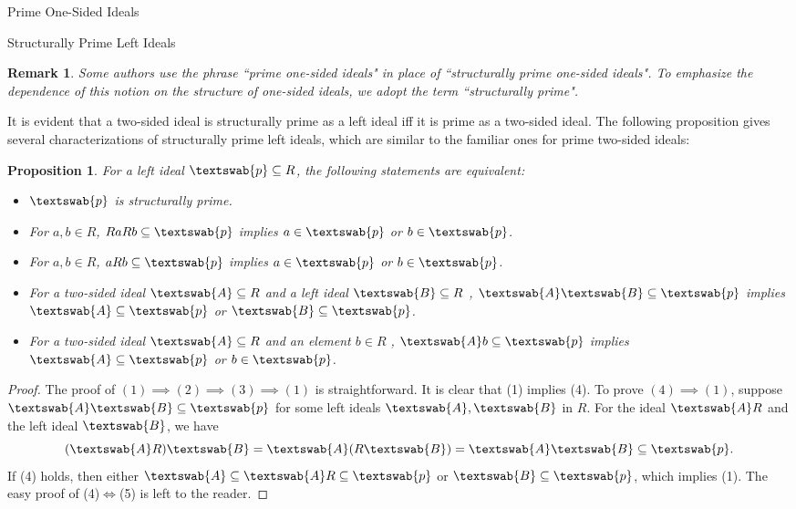 \documentclass[11pt,a4paper]{article}
\theoremstyle{theorem}
\newtheorem{proposition}[theorem]{Proposition}
\newtheorem{remark}{Remark}[section]
\numberwithin{equation}{section}
\begin{document}
\begin{section}{Prime One-Sided Ideals}
\begin{subsection}{Structurally Prime Left Ideals}
 \begin{remark}
 	Some authors use the phrase ``prime one-sided ideals" in place of ``structurally prime one-sided ideals".  To emphasize the dependence of this notion on the structure of one-sided ideals, we adopt the term ``structurally prime". 
 \end{remark}
 It is evident that a two-sided ideal is structurally prime as a left ideal iff it is prime as a two-sided ideal. The following proposition gives several characterizations of structurally prime left ideals, which are similar to the familiar ones for prime two-sided ideals:
 \begin{proposition}\label{prop: characterization of structurally prime ideals}
 	For a left ideal \( \textswab{p} \subseteq R \), the following statements are equivalent:
 	\begin{itemize}
 		\item[(1)] \( \textswab{p} \) is structurally prime.
 		\item[(2)] For \( a,b\in R\), \(RaRb\subseteq \textswab{p}\) implies \( a\in \textswab{p} \) or \( b\in   \textswab{p} \).
 		\item[(3)] For \( a,b\in R\), \(aRb\subseteq \textswab{p}\) implies \( a\in \textswab{p} \) or \( b\in   \textswab{p} \).
 		\item[(4)]  For a two-sided ideal \( \textswab{A} \subseteq R \) and a left ideal  \( \textswab{B} \subseteq R \)  , \( \textswab{A}\textswab{B} \subseteq \textswab{p} \) implies \( \textswab{A} \subseteq \textswab{p} \) or \( \textswab{B} \subseteq \textswab{p} \).
 		\item[(5)]  For a two-sided ideal \( \textswab{A} \subseteq R \) and an element  \( b\in R \)  , \( \textswab{A}b \subseteq \textswab{p} \) implies \( \textswab{A} \subseteq \textswab{p} \) or \( b \in \textswab{p} \).
 	\end{itemize}
 \end{proposition}
 \begin{proof}
 	The proof of \((1)\implies (2)\implies (3)\implies (1)\) is straightforward. It is clear that (1) implies (4). To prove \((4)\implies (1)\), suppose  \( \textswab{A}\textswab{B}\subseteq\textswab{p}\) for some left ideals \( \textswab{A},\textswab{B}\) in \(R\). For the ideal \(\textswab{A}R \) and the left ideal \(\textswab{B}\), we have
 	\[
 		(\textswab{A}R)\textswab{B}= \textswab{A}(R\textswab{B})=\textswab{A}\textswab{B}\subseteq\textswab{p}.
 	\]
 	If (4) holds, then either  \( \textswab{A} \subseteq \textswab{A}R \subseteq \textswab{p} \) or \( \textswab{B} \subseteq \textswab{p} \), which implies (1). The easy proof of (4)\(\iff\)(5) is left to the reader.  

\end{proof}
\end{subsection}
\end{section}
\end{document}

